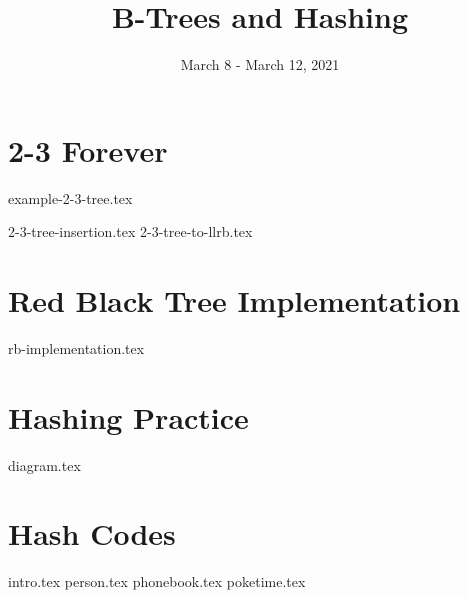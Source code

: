 \documentclass[11pt]{exam}
\title{B-Trees and Hashing}
\date{March 8 - March 12, 2021}
\begin{document}
\maketitle

\section{2-3 Forever}
{example-2-3-tree.tex}
\begin{questions}
{2-3-tree-insertion.tex}
{2-3-tree-to-llrb.tex}
\end{questions}
\newpage

\section{Red Black Tree Implementation}
\begin{questions}
{rb-implementation.tex}
\end{questions}
\newpage

\section{Hashing Practice}
\begin{questions}
{diagram.tex}
\end{questions}
\newpage

\section{Hash Codes}
\begin{questions}
{intro.tex}
{person.tex}
{phonebook.tex}
\newpage
{poketime.tex}
\end{questions}
\end{document}
